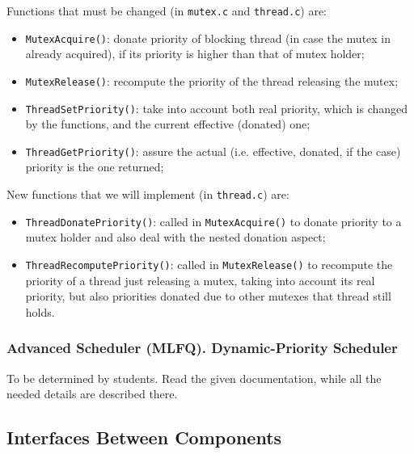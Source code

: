 Functions that must be changed (in \lstinline|mutex.c| and \lstinline|thread.c|) are:
\begin{itemize}
    \item \lstinline|MutexAcquire()|: donate priority of blocking thread (in case the mutex in already acquired), if its priority is higher than that of mutex holder;
    
    \item \lstinline|MutexRelease()|: recompute the priority of the thread releasing the mutex;
    
    \item \lstinline|ThreadSetPriority()|: take into account both real priority, which is changed by the functions, and the current effective (donated) one;
    
    \item \lstinline|ThreadGetPriority()|: assure the actual (i.e. effective, donated, if the case) priority is the one returned;
\end{itemize}

New functions that we will implement (in \lstinline|thread.c|) are:
\begin{itemize}
    \item \lstinline|ThreadDonatePriority()|: called in \lstinline|MutexAcquire()| to donate priority to a mutex holder and also deal with the nested donation aspect;
    
    \item \lstinline|ThreadRecomputePriority()|: called in \lstinline|MutexRelease()| to recompute the priority of a thread just releasing a mutex, taking into account its real priority, but also priorities donated due to other mutexes that thread still holds.
\end{itemize}


\subsubsection{Advanced Scheduler (MLFQ). Dynamic-Priority Scheduler}
\label{subsubsec:mlfq-data-structures}

To be determined by students. Read the given documentation, while all the needed details are described there.

\subsection{Interfaces Between Components}

